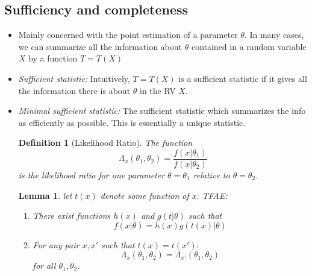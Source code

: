\documentclass[12pt]{report} \addtolength{\textheight}{2in}
\newtheorem{defn}{Definition}
\newtheorem{lemma}{Lemma}
\begin{document}
\subsection*{Sufficiency and completeness}
\begin{itemize}
\item Mainly concerned with the point estimation of a parameter $\theta.$ In many cases, we can summarize all the information about $\theta$ contained in a random variable $X$ by a function $T=T(X)$
\item \textit{Sufficient statistic:} Intuitively, $T=T(X)$ is a sufficient statistic if it gives all the information there is about $\theta$ in the RV $X.$
\item \textit{Minimal sufficient statistic:} The sufficient statistic which summarizes the info as efficiently as possible. This is essentially a unique statistic.
\begin{defn}[Likelihood Ratio] The function
\begin{displaymath}
\Lambda_x(\theta_1,\theta_2)=\frac{f(x|\theta_1)}{f(x|\theta_2)}
\end{displaymath}
is the likelihood ratio for one parameter $\theta=\theta_1$ relative to $\theta=\theta_2.$
\end{defn}
\begin{lemma} let $t(x)$ denote some function of $x.$ TFAE:
\begin{enumerate}
\item[(i)] There exist functions $h(x)$ and $g(t|\theta)$ such that 
\begin{displaymath}
f(x|\theta)=h(x)g(t(x)|\theta)
\end{displaymath}
\item[(ii)] For any pair $x, x'$ such that $t(x)=t(x'):$
\begin{displaymath}
\Lambda_x(\theta_1,\theta_2)=\Lambda_{x'}(\theta_1,\theta_2)
\end{displaymath}
for all $\theta_1, \theta_2.$
\end{enumerate}
\end{lemma}

\end{itemize}
\end{document}
